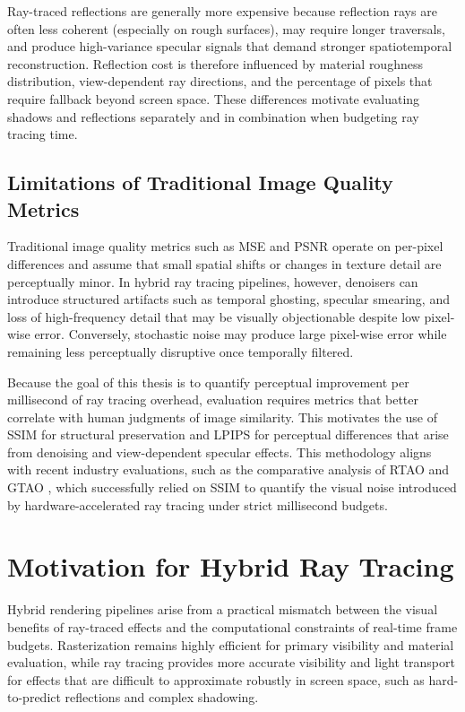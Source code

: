 \documentclass[12pt,a4paper]{report}
\newcommand{\daesection}[1]{
  \section{#1}
}
\begin{document}
Ray-traced reflections are generally more expensive because reflection rays are often less coherent (especially on rough surfaces), may require longer traversals,
and produce high-variance specular signals that demand stronger spatiotemporal reconstruction. Reflection cost is therefore influenced by material roughness distribution,
view-dependent ray directions, and the percentage of pixels that require fallback beyond screen space. These differences motivate evaluating shadows and reflections separately and in combination when budgeting ray tracing time\cite{akenine2018realtimerendering, haines2019raytracinggems}.

\subsection{Limitations of Traditional Image Quality Metrics}
Traditional image quality metrics such as MSE and PSNR operate on per-pixel differences and assume that small spatial shifts or changes in texture detail are perceptually minor. In hybrid ray tracing pipelines,
however, denoisers can introduce structured artifacts such as temporal ghosting, specular smearing, and loss of high-frequency detail that may be visually objectionable despite low pixel-wise error.
Conversely, stochastic noise may produce large pixel-wise error while remaining less perceptually disruptive once temporally filtered.

Because the goal of this thesis is to quantify perceptual improvement per millisecond of ray tracing overhead, evaluation requires metrics that better correlate with human judgments of image similarity.
This motivates the use of SSIM for structural preservation and LPIPS for perceptual differences that arise from denoising and view-dependent specular effects\cite{zhang2018lpips, schied2017svgf}.
This methodology aligns with recent industry evaluations, such as the comparative analysis of RTAO and GTAO \cite{waldner2021rtao},
which successfully relied on SSIM to quantify the visual noise introduced by hardware-accelerated ray tracing under strict millisecond budgets.

\daesection{Motivation for Hybrid Ray Tracing}
Hybrid rendering pipelines arise from a practical mismatch between the visual
benefits of ray-traced effects and the computational constraints of real-time
frame budgets. Rasterization remains highly efficient for primary visibility and
material evaluation, while ray tracing provides more accurate visibility and
light transport for effects that are difficult to approximate robustly in screen
space, such as hard-to-predict reflections and complex shadowing.
\end{document}
